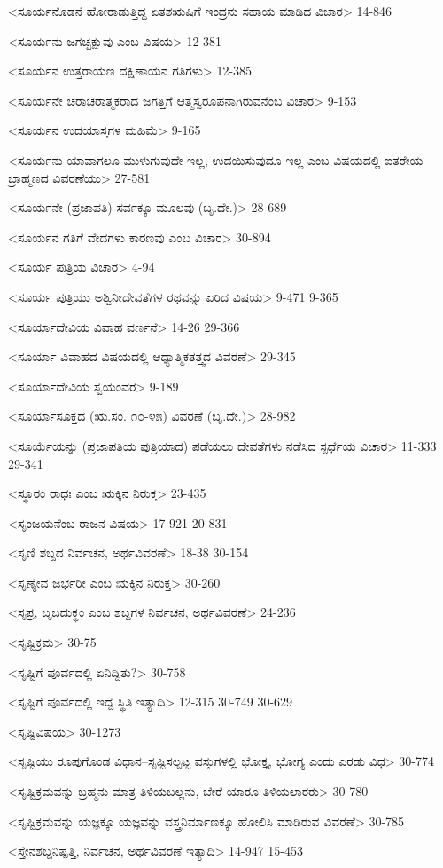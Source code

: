<ಸೂರ್ಯನೊಡನೆ ಹೋರಾಡುತ್ತಿದ್ದ ಏತಶಋಷಿಗೆ ಇಂದ್ರನು ಸಹಾಯ ಮಾಡಿದ ವಿಚಾರ>
14-846

<ಸೂರ್ಯನು ಜಗಚ್ಛಕ್ಷುವು ಎಂಬ ವಿಷಯ>
12-381

<ಸೂರ್ಯನ ಉತ್ತರಾಯಣ ದಕ್ಷಿಣಾಯನ ಗತಿಗಳು>
12-385

<ಸೂರ್ಯನೇ ಚರಾಚರಾತ್ಮಕರಾದ ಜಗತ್ತಿಗೆ ಆತ್ಮಸ್ವರೂಪನಾಗಿರುವನೆಂಬ ವಿಚಾರ>
9-153

<ಸೂರ್ಯನ ಉದಯಾಸ್ತಗಳ ಮಹಿಮೆ>
9-165

<ಸೂರ್ಯನು ಯಾವಾಗಲೂ ಮುಳುಗುವುದೇ ಇಲ್ಲ, ಉದಯಿಸುವುದೂ ಇಲ್ಲ ಎಂಬ ವಿಷಯದಲ್ಲಿ ಐತರೇಯ ಬ್ರಾಹ್ಮಣದ ವಿವರಣೆಯು>
27-581

<ಸೂರ್ಯನೇ (ಪ್ರಜಾಪತಿ) ಸರ್ವಕ್ಕೂ ಮೂಲವು (ಬೃ.ದೇ.)>
28-689

<ಸೂರ್ಯನ ಗತಿಗೆ ವೇದಗಳು ಕಾರಣವು ಎಂಬ ವಿಚಾರ>
30-894

<ಸೂರ್ಯ ಪುತ್ರಿಯ ವಿಚಾರ>
4-94

<ಸೂರ್ಯ ಪುತ್ರಿಯು ಅಶ್ವಿನೀದೇವತೆಗಳ ರಥವನ್ನು ಏರಿದ ವಿಷಯ>
9-471
9-365

<ಸೂರ್ಯಾದೇವಿಯ ವಿವಾಹ ವರ್ಣನೆ>
14-26
29-366

<ಸೂರ್ಯಾ ವಿವಾಹದ ವಿಷಯದಲ್ಲಿ ಆಧ್ಯಾತ್ಮಿಕತತ್ತ್ವದ ವಿವರಣೆ>
29-345

<ಸೂರ್ಯಾದೇವಿಯ ಸ್ವಯಂವರ>
9-189

<ಸೂರ್ಯಾಸೂಕ್ತದ (ಋ.ಸಂ. ೧೦-೪೫) ವಿವರಣೆ (ಬೃ.ದೇ.)>
28-982

<ಸೂರ್ಯೆಯನ್ನು (ಪ್ರಜಾಪತಿಯ ಪುತ್ರಿಯಾದ) ಪಡೆಯಲು ದೇವತೆಗಳು ನಡೆಸಿದ ಸ್ಪರ್ಧೆಯ ವಿಚಾರ>
11-333
29-341

<ಸ್ಥೂರಂ ರಾಧಃ ಎಂಬ ಋಕ್ಕಿನ ನಿರುಕ್ತ>
23-435

<ಸೃಂಜಯನೆಂಬ ರಾಜನ ವಿಷಯ>
17-921
20-831

<ಸೃಣಿ ಶಬ್ದದ ನಿರ್ವಚನ, ಅರ್ಥವಿವರಣೆ>
18-38
30-154

<ಸೃಣ್ಯೇವ ಜರ್ಭರೀ ಎಂಬ ಋಕ್ಕಿನ ನಿರುಕ್ತ>
30-260

<ಸೃಪ್ರ, ಬೃಬದುಕ್ಥಂ ಎಂಬ ಶಬ್ದಗಳ ನಿರ್ವಚನ, ಅರ್ಥವಿವರಣೆ>
24-236

<ಸೃಷ್ಟಿಕ್ರಮ>
30-75

<ಸೃಷ್ಟಿಗೆ ಪೂರ್ವದಲ್ಲಿ ಏನಿದ್ದಿತು?>
30-758

<ಸೃಷ್ಟಿಗೆ ಪೂರ್ವದಲ್ಲಿ ಇದ್ದ ಸ್ಥಿತಿ ಇತ್ಯಾದಿ>
12-315 
30-749
30-629

<ಸೃಷ್ಟಿವಿಷಯ>
30-1273

<ಸೃಷ್ಟಿಯು ರೂಪುಗೊಂಡ ವಿಧಾನ–ಸೃಷ್ಟಿಸಲ್ಪಟ್ಟ ವಸ್ತುಗಳಲ್ಲಿ ಭೋಕ್ತೃ, ಭೋಗ್ಯ ಎಂದು ಎರಡು ವಿಧ>
30-774

<ಸೃಷ್ಟಿಕ್ರಮವನ್ನು ಬ್ರಹ್ಮನು ಮಾತ್ರ ತಿಳಿಯಬಲ್ಲನು, ಬೇರೆ ಯಾರೂ ತಿಳಿಯಲಾರರು>
30-780

<ಸೃಷ್ಟಿಕ್ರಮವನ್ನು ಯಜ್ಞಕ್ಕೂ ಯಜ್ಞವನ್ನು ವಸ್ತ್ರನಿರ್ಮಾಣಕ್ಕೂ ಹೋಲಿಸಿ ಮಾಡಿರುವ ವಿವರಣೆ>
30-785

<ಸ್ತೇನಶಬ್ದನಿಷ್ಪತ್ತಿ, ನಿರ್ವಚನ, ಅರ್ಥವಿವರಣೆ ಇತ್ಯಾದಿ>
14-947
15-453

